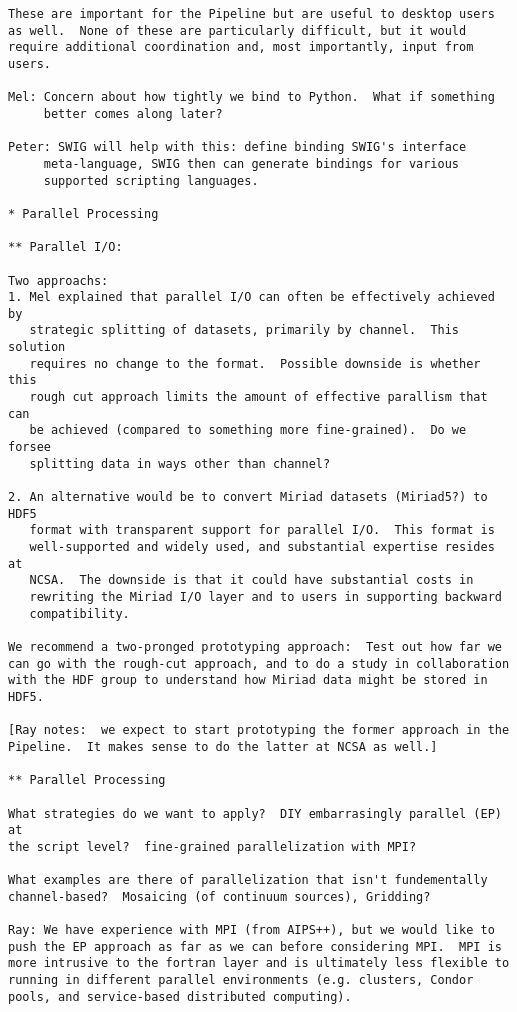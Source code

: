\begin{verbatim}
These are important for the Pipeline but are useful to desktop users
as well.  None of these are particularly difficult, but it would
require additional coordination and, most importantly, input from
users.  

Mel: Concern about how tightly we bind to Python.  What if something
     better comes along later?  

Peter: SWIG will help with this: define binding SWIG's interface
     meta-language, SWIG then can generate bindings for various
     supported scripting languages.  

* Parallel Processing

** Parallel I/O:

Two approachs:
1. Mel explained that parallel I/O can often be effectively achieved by
   strategic splitting of datasets, primarily by channel.  This solution
   requires no change to the format.  Possible downside is whether this
   rough cut approach limits the amount of effective parallism that can
   be achieved (compared to something more fine-grained).  Do we forsee
   splitting data in ways other than channel?
   
2. An alternative would be to convert Miriad datasets (Miriad5?) to HDF5
   format with transparent support for parallel I/O.  This format is
   well-supported and widely used, and substantial expertise resides at
   NCSA.  The downside is that it could have substantial costs in
   rewriting the Miriad I/O layer and to users in supporting backward
   compatibility.  

We recommend a two-pronged prototyping approach:  Test out how far we
can go with the rough-cut approach, and to do a study in collaboration
with the HDF group to understand how Miriad data might be stored in
HDF5.  

[Ray notes:  we expect to start prototyping the former approach in the
Pipeline.  It makes sense to do the latter at NCSA as well.]

** Parallel Processing

What strategies do we want to apply?  DIY embarrasingly parallel (EP) at
the script level?  fine-grained parallelization with MPI?

What examples are there of parallelization that isn't fundementally
channel-based?  Mosaicing (of continuum sources), Gridding?

Ray: We have experience with MPI (from AIPS++), but we would like to
push the EP approach as far as we can before considering MPI.  MPI is
more intrusive to the fortran layer and is ultimately less flexible to
running in different parallel environments (e.g. clusters, Condor
pools, and service-based distributed computing).


\end{verbatim}
